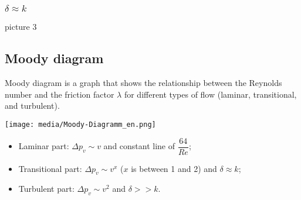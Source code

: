 \documentclass{article}
\begin{document}
\subsubsection{$\delta \approx  k$}
picture 3

\newpage
\subsection{Moody diagram}
Moody diagram is a graph that shows the relationship between the Reynolds number
and the friction factor $\lambda$ for different types of flow (laminar, transitional, and turbulent).
\begin{center}
    \texttt{[image: media/Moody-Diagramm\_en.png]}
\end{center}

\vspace*{0.5cm}
\begin{itemize}
    \item Laminar part: $\Delta p_v \sim v$ and constant line of $\dfrac{64}{Re}$;
    \item Transitional part: $\Delta p_v \sim v^x$ ($x$ is between 1 and 2) and $\delta \approx k$;
    \item Turbulent part: $\Delta p_v \sim v^2$ and $\delta >> k$.
\end{itemize}
\end{document}
